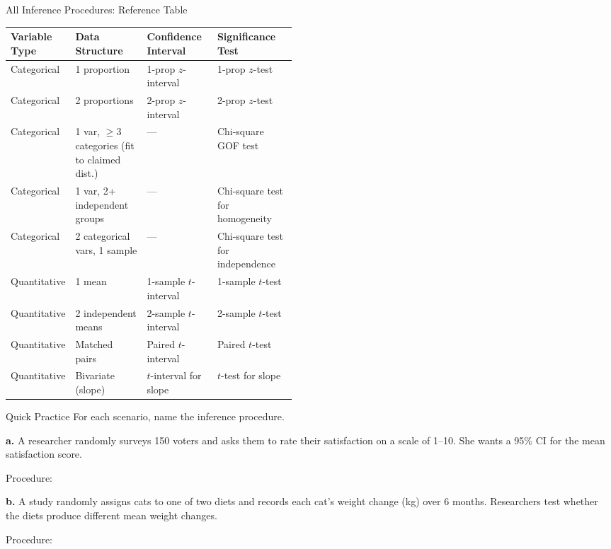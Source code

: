 \documentclass[10pt]{article}
\begin{document}
\begin{notesbox}{All Inference Procedures: Reference Table}
\renewcommand{\arraystretch}{1.6}
\begin{tabularx}{\linewidth}{@{} p{0.22\linewidth} p{0.25\linewidth} X X @{}}
  \rowcolor{sky}
  \textbf{Variable Type} & \textbf{Data Structure} & \textbf{Confidence Interval} & \textbf{Significance Test} \\
  \hline
  Categorical & 1 proportion & 1-prop $z$-interval & 1-prop $z$-test \\
  Categorical & 2 proportions & 2-prop $z$-interval & 2-prop $z$-test \\
  Categorical & 1 var, $\ge$3 categories (fit to claimed dist.) & --- & Chi-square GOF test \\
  Categorical & 1 var, 2+ independent groups & --- & Chi-square test for homogeneity \\
  Categorical & 2 categorical vars, 1 sample & --- & Chi-square test for independence \\
  Quantitative & 1 mean & 1-sample $t$-interval & 1-sample $t$-test \\
  Quantitative & 2 independent means & 2-sample $t$-interval & 2-sample $t$-test \\
  Quantitative & Matched pairs & Paired $t$-interval & Paired $t$-test \\
  Quantitative & Bivariate (slope) & $t$-interval for slope & $t$-test for slope \\
\end{tabularx}
\end{notesbox}

\begin{notesbox}{Quick Practice}
For each scenario, name the inference procedure.

\vspace{0.1in}
\textbf{a.} A researcher randomly surveys 150 voters and asks them to rate their satisfaction on a scale of 1--10. She wants a 95\% CI for the mean satisfaction score.

\hspace{0.5cm} Procedure: 

\vspace{0.15in}
\textbf{b.} A study randomly assigns cats to one of two diets and records each cat's weight change (kg) over 6 months. Researchers test whether the diets produce different mean weight changes.

\hspace{0.5cm} Procedure: 
\end{notesbox}
\end{document}
